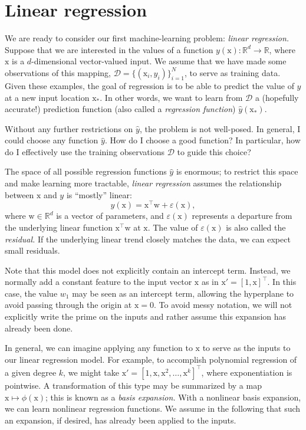 \documentclass{article}
\newcommand{\mc}[1]{\mathcal{#1}}
\newcommand{\data}{\mc{D}}
\newcommand{\trans}{^\top}
\renewcommand{\vec}[1]{\bm{\mathrm{#1}}}
\newcommand{\R}{\mathbb{R}}
\renewcommand{\epsilon}{\varepsilon}
\begin{document}
\section*{Linear regression}

We are ready to consider our first machine-learning problem:
\emph{linear regression.}  Suppose that we are interested in the
values of a function $y(\vec{x})\colon \R^d \to \R$, where $\vec{x}$ is
a $d$-dimensional vector-valued input.  We assume that we have made
some observations of this mapping, $\data = \bigl\{ (\vec{x}_i, y_i)
\bigr\}_{i = 1}^N$, to serve as training data.  Given these examples,
the goal of regression is to be able to predict the value of $y$ at a
new input location $\vec{x}_\ast$.  In other words, we want to learn
from $\data$ a (hopefully accurate!) prediction function (also called
a \emph{regression function}) $\hat{y}(\vec{x}_\ast)$.

Without any further restrictions on $\hat{y}$, the problem is not
well-posed.  In general, I could choose any function $\hat{y}$.  How
do I choose a good function?  In particular, how do I effectively use
the training observations $\data$ to guide this choice?

The space of all possible regression functions $\hat{y}$ is enormous;
to restrict this space and make learning more tractable, \emph{linear
  regression} assumes the relationship between $\vec{x}$ and $y$ is
``mostly'' linear:
\begin{equation}
  \label{linear_assumption}
  y(\vec{x}) = \vec{x}\trans \vec{w} + \epsilon(\vec{x}),
\end{equation}
where $\vec{w} \in \R^d$ is a vector of parameters, and
$\epsilon(\vec{x})$ represents a departure from the underlying linear
function $\vec{x}\trans \vec{w}$ at $\vec{x}$.  The value of
$\epsilon(\vec{x})$ is also called the \emph{residual.}  If the
underlying linear trend closely matches the data, we can expect small
residuals.

Note that this model does not explicitly contain an intercept term.
Instead, we normally add a constant feature to the input vector
$\vec{x}$ as in $\vec{x}' = [1, \vec{x}]\trans$.  In this case, the value
$w_1$ may be seen as an intercept term, allowing the hyperplane to
avoid passing through the origin at $\vec{x} = 0$.  To avoid messy
notation, we will not explicitly write the prime on the inputs and
rather assume this expansion has already been done.

In general, we can imagine applying any function to $\vec{x}$ to serve
as the inputs to our linear regression model.  For example, to
accomplish polynomial regression of a given degree $k$, we might take
$\vec{x}' = [1, \vec{x}, \vec{x}^2, \dots, \vec{x}^k]\trans$, where
exponentiation is pointwise.  A transformation of this type may be
summarized by a map $\vec{x} \mapsto \phi(\vec{x})$; this is known as
a \emph{basis expansion.}  With a nonlinear basis expansion, we can
learn nonlinear regression functions.  We assume in the following that
such an expansion, if desired, has already been applied to the inputs.
\end{document}
